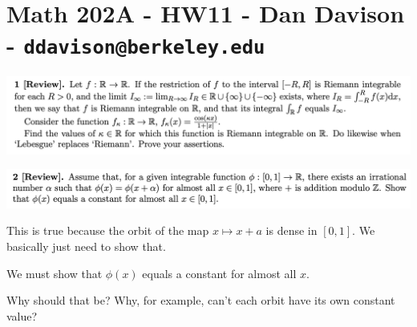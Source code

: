 \section*{Math 202A - HW11 - Dan Davison - \texttt{ddavison@berkeley.edu}}

\begin{mdframed}
\includegraphics[width=400pt]{img/analysis--berkeley-202a-hw11-8650.png}
\end{mdframed}


\begin{mdframed}
\includegraphics[width=400pt]{img/analysis--berkeley-202a-hw11-b6a3.png}
\end{mdframed}

This is true because the orbit of the map $x \mapsto x + a$ is dense in $[0, 1]$. We basically just need to show that.

We must show that $\phi(x)$ equals a constant for almost all $x$.

Why should that be? Why, for example, can't each orbit have its own constant value?


